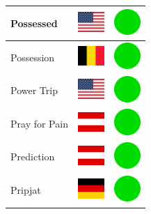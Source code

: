 \documentclass[12pt, a4paper, twoside]{report}
\begin{document}
\begin{center}
\begin{longtable}{|p{5cm}|p{2cm}|p{2cm}|}
 Possessed                                                  & \includegraphics[width=1cm]{../4x3/us} &   \includegraphics[width=1cm]{../likes/y} \\ \hline
 Possession                                                 & \includegraphics[width=1cm]{../4x3/be} &   \includegraphics[width=1cm]{../likes/y} \\ \hline
 Power Trip                                                 & \includegraphics[width=1cm]{../4x3/us} &   \includegraphics[width=1cm]{../likes/y} \\ \hline
 Pray for Pain                                              & \includegraphics[width=1cm]{../4x3/at} &   \includegraphics[width=1cm]{../likes/y} \\ \hline
 Prediction                                                 & \includegraphics[width=1cm]{../4x3/at} &   \includegraphics[width=1cm]{../likes/y} \\ \hline
 Pripjat                                                    & \includegraphics[width=1cm]{../4x3/de} &   \includegraphics[width=1cm]{../likes/y} \\ \hline

\end{longtable}
\end{center}
\end{document}
